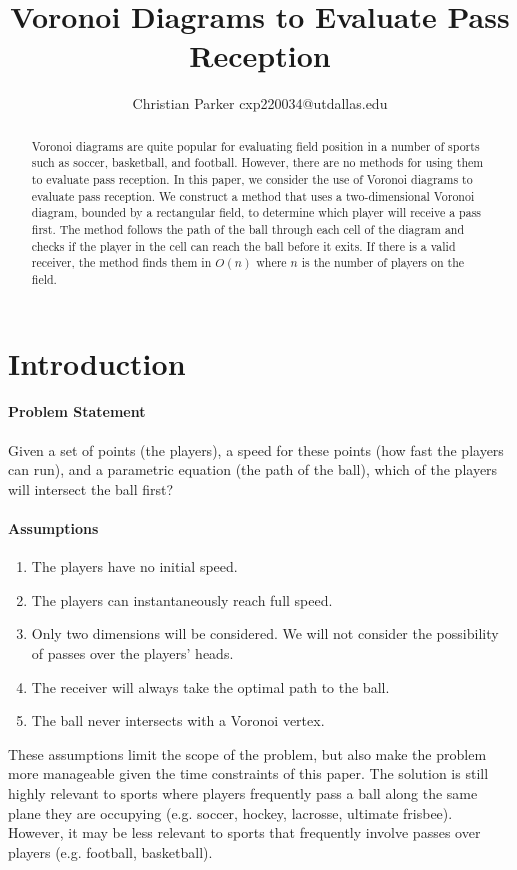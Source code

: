 \documentclass[11pt]{article}
\begin{document}
\title{Voronoi Diagrams to Evaluate Pass Reception}
\author{Christian Parker cxp220034@utdallas.edu}
\date{}
\maketitle

\begin{abstract}
    Voronoi diagrams are quite popular for evaluating field position in a number of sports such as soccer, basketball, and football. However, there are no methods for using them to
    evaluate pass reception. In this paper, we consider the use of Voronoi diagrams to evaluate pass reception. We construct a method that uses a two-dimensional Voronoi diagram,
    bounded by a rectangular field, to determine which player will receive a pass first. The method follows the path of the ball through each cell of the diagram and checks if the player
    in the cell can reach the ball before it exits. If there is a valid receiver, the method finds them in \(O(n)\) where \(n\) is the number of players on the field.
\end{abstract}

\section*{Introduction}
\paragraph{Problem Statement}
\begin{center}
    Given a set of points (the players), a speed for these points (how fast the players can run),
    and a parametric equation (the path of the ball), which of the players will intersect the ball first?
\end{center}

\paragraph{Assumptions}
\begin{enumerate}
    \item The players have no initial speed.
    \item The players can instantaneously reach full speed.
    \item Only two dimensions will be considered. We will not consider the possibility of passes over the players' heads.
    \item The receiver will always take the optimal path to the ball.
    \item The ball never intersects with a Voronoi vertex.
\end{enumerate}
These assumptions limit the scope of the problem, but also make the problem more manageable given the time constraints of this paper.
The solution is still highly relevant to sports where players frequently pass a ball along the same plane they are occupying (e.g. soccer, hockey, lacrosse, ultimate frisbee).
However, it may be less relevant to sports that frequently involve passes over players (e.g. football, basketball).
\end{document}
